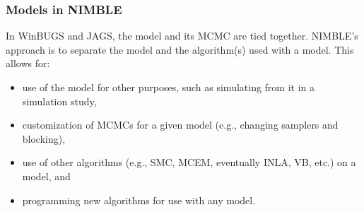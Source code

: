 \documentclass{beamer}\usepackage[]{graphicx}\usepackage[]{color}
\begin{document}
\begin{frame}[fragile] 
\sffamily
\frametitle{Models in NIMBLE}
{\scriptsize
In WinBUGS and JAGS, the model and its MCMC are tied together. NIMBLE's approach is to separate the model and the algorithm(s) used with a model. This allows for:

\begin{itemize}
\item use of the model for other purposes, such as simulating from it in a simulation study,
\item customization of MCMCs for a given model (e.g., changing samplers and blocking),
\item use of other algorithms (e.g., SMC, MCEM, eventually INLA, VB, etc.) on a model, and
\item programming new algorithms for use with any model.
\end{itemize}

}
\end{frame}
\end{document}
